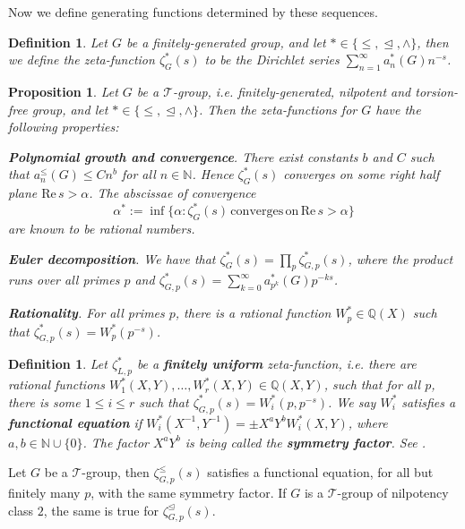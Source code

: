 \documentclass[12pt]{article}
\newtheorem{proposition}[theorem]{Proposition}
\newtheorem{definition}[theorem]{Definition}
\begin{document}
Now we define generating functions determined by these sequences. 
\begin{definition}
\label{def:zeta.function}
Let $G$ be a finitely-generated group, and let $\ast\in\{\leq,\trianglelefteq,\wedge\}$, then we define the zeta-function $\zeta_{G}^{\ast}(s)$ to be the Dirichlet series $\sum_{n=1}^{\infty}a_{n}^{\ast}(G){n}^{-s}$. 
\end{definition}
\begin{proposition}
Let $G$ be a $\mathcal{T}$-group, i.e. finitely-generated, nilpotent and torsion-free group, and let $\ast\in\{\leq,\trianglelefteq,\wedge\}$. Then the zeta-functions for $G$ have the following properties:\par
\textbf{Polynomial growth and convergence}. There exist constants $b$ and $C$ such that $a_{n}^{\leq}(G)\leq{C}{n}^{b}$ for all $n\in\mathbb{N}$. Hence $\zeta_{G}^{\ast}(s)$ converges on some right half plane $\mathrm{Re}\,s>\alpha$. The abscissae of convergence \[\alpha^{\ast}:=\inf\{\alpha : \zeta_{G}^{\ast}(s)\,\mathrm{converges}\,\mathrm{on}\,\mathrm{Re}\,s>\alpha\}\] are known to be rational numbers.

\textbf{Euler decomposition}.
We have that $\zeta_{G}^{\ast}(s)=\prod_{p}\zeta_{G,p}^{\ast}(s)$, where the product runs over all primes $p$ and $\zeta_{G,p}^{\ast}(s)=\sum_{k=0}^{\infty}a_{p^k}^{\ast}(G)p^{-ks}$. \cite{BermanGlazerSchein}

\textbf{Rationality}. For all primes $p$, there is a rational function $W_{p}^{\ast}\in\mathbb{Q}(X)$ such that $\zeta_{G,p}^{\ast}(s)=W_{p}^{\ast}(p^{-s})$.
\end{proposition}
\begin{definition}
Let $\zeta_{L,p}^{\ast}$ be a \textbf{finitely uniform} zeta-function, i.e. there are rational functions $W_{1}^{\ast}(X,Y),\dots,W_{r}^{\ast}(X,Y)\in\mathbb{Q}(X,Y)$, such that for all $p$, there is some $1\leq{i}\leq{r}$ such that $\zeta_{G,p}^{\ast}(s)=W_{i}^{\ast}(p,p^{-s})$. We say $W_{i}^{\ast}$ satisfies a \textbf{functional equation} if $W_{i}^{\ast}(X^{-1},Y^{-1})=\pm{X}^{a}{Y}^{b}{W_{i}^{\ast}(X,Y)}$, where $a,b\in\mathbb{N}\cup\{0\}$. The factor $X^{a}Y^{b}$ is being called the \textbf{symmetry factor}. See \cite{Voll}.
\end{definition}
Let $G$ be a $\mathcal{T}$-group, then $\zeta_{G,p}^{\leq}(s)$ satisfies a functional equation, for all but finitely many $p$, with the same symmetry factor. If $G$ is a $\mathcal{T}$-group of nilpotency class $2$, the same is true for $\zeta_{G,p}^{\trianglelefteq}(s)$.
\end{document}
